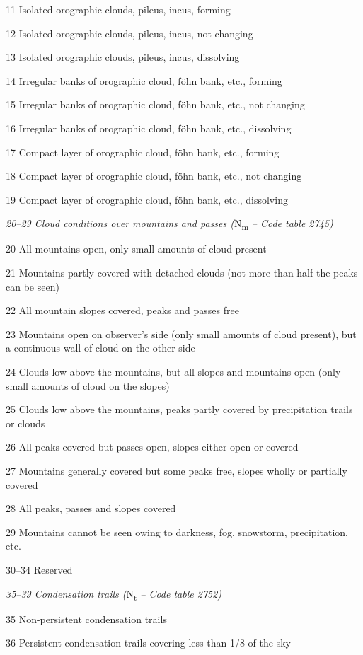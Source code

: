11 Isolated orographic clouds, pileus, incus, forming

12 Isolated orographic clouds, pileus, incus, not changing

13 Isolated orographic clouds, pileus, incus, dissolving

14 Irregular banks of orographic cloud, föhn bank, etc., forming

15 Irregular banks of orographic cloud, föhn bank, etc., not changing

16 Irregular banks of orographic cloud, föhn bank, etc., dissolving

17 Compact layer of orographic cloud, föhn bank, etc., forming

18 Compact layer of orographic cloud, föhn bank, etc., not changing

19 Compact layer of orographic cloud, föhn bank, etc., dissolving

\emph{20--29 Cloud conditions over mountains and passes (}N\textsubscript{m} \emph{-- Code table 2745)}

20 All mountains open, only small amounts of cloud present

21 Mountains partly covered with detached clouds (not more than half the peaks can be seen)

22 All mountain slopes covered, peaks and passes free

23 Mountains open on observer's side (only small amounts of cloud present), but a continuous wall of cloud on the other side

24 Clouds low above the mountains, but all slopes and mountains open (only small amounts of cloud on the slopes)

25 Clouds low above the mountains, peaks partly covered by precipitation trails or clouds

26 All peaks covered but passes open, slopes either open or covered

27 Mountains generally covered but some peaks free, slopes wholly or partially covered

28 All peaks, passes and slopes covered

29 Mountains cannot be seen owing to darkness, fog, snowstorm, precipitation, etc.

30--34 Reserved

\emph{35--39 Condensation trails (}N\textsubscript{t} \emph{-- Code table 2752)}

35 Non-persistent condensation trails

36 Persistent condensation trails covering less than 1/8 of the sky

